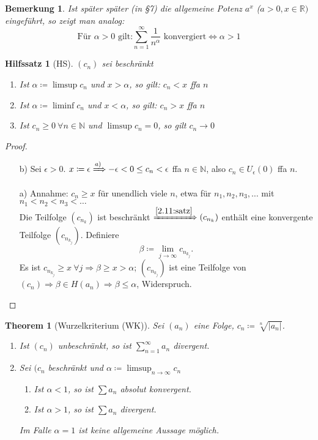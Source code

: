 \documentclass[12pt]{extreport} %
\newcommand{\N}{\mathbb{N}}
\newcommand{\R}{\mathbb{R}}
\theoremstyle{named}
\newtheorem{unnamedtheorem}{Theorem} \counterwithin{unnamedtheorem}{chapter}
\theoremstyle{dotless}
\newtheorem*{bemerkung}{Bemerkung}
\newtheorem*{hilfssatz*}{Hilfssatz}
\begin{document}
\begin{bemerkung}
	Ist später später (in \S 7) die allgemeine Potenz $a^{x}$ ($a > 0, x \in \R)$ eingeführt, so zeigt man analog:
	$$ \text{Für } \alpha > 0 \text{ gilt:} \sum_{n=1}^{\infty} \frac{1}{n^{\alpha}} \text{ konvergiert} \iff \alpha > 1 $$
\end{bemerkung}


\begin{hilfssatz*}[HS]
	$(c_{n})$ sei beschränkt
	\begin{enumerate}
		\item Ist $\alpha \coloneqq \limsup c_{n}$ und $x > \alpha$, so gilt: $c_{n} < x$ ffa $n$
				
		\item Ist $\alpha \coloneqq \liminf c_{n}$ und $x < \alpha$, so gilt: $c_{n} > x$ ffa $n$
		\item Ist $c_{n} \geq 0 ~\forall n \in \N$ und $\limsup c_{n} = 0$, so gilt $c_{n} \rightarrow 0$
	\end{enumerate}
\end{hilfssatz*}

\begin{proof} ~\
	\begin{enumerate}
		\item[b)] Sei $\epsilon > 0$. $x \coloneqq \epsilon \xRightarrow[]{a)} -\epsilon < 0 \leq c_{n} < \epsilon$ ffa $n \in \N$, also $c_{n} \in U_{\epsilon}(0)$ ffa $n$.
		\item[a)] Annahme: $c_{n} \geq x$ für unendlich viele $n$, etwa für $n_{1}, n_{2}, n_{3}, \dotsc$ mit $n_{1} < n_{2} < n_{3} < \dotsc$ \\
		 Die Teilfolge $(c_{n_{k}})$ ist beschränkt $\xRightarrow[]{\ref{2.11:satz}} (c_{n_{k}})$ enthält eine konvergente Teilfolge $(c_{n_{k_{j}}})$. Definiere
		 $$ \beta \coloneqq \lim_{j\rightarrow \infty} c_{n_{k_{j}}}. $$
		 Es ist $c_{n_{k_{j}}} \geq x ~\forall j \Rightarrow \beta \geq x > \alpha$; $(c_{n_{k_{j}}})$ ist eine Teilfolge von $(c_{n}) \Rightarrow \beta \in H(a_{n}) \Rightarrow \beta \leq \alpha$, Widerspruch.
	\end{enumerate}	
\end{proof}

\begin{unnamedtheorem}[Wurzelkriterium (WK)] \label{3.6:prop-Wurzelkriterium}
	Sei $(a_{n})$ eine Folge, $c_{n} \coloneqq \sqrt[n]{|a_{n}|}$.
	\begin{enumerate}
		\item Ist $(c_{n})$ unbeschränkt, so ist $\sum_{n=1}^{\infty} a_{n}$ divergent.
		\item Sei $(c_{n}$ beschränkt und $\alpha \coloneqq \limsup_{n \rightarrow \infty} c_{n}$
			\begin{enumerate}
				\item Ist $\alpha < 1$, so ist $\sum a_{n}$ absolut konvergent.
				\item Ist $\alpha > 1$, so ist $\sum a_{n}$ divergent.
			\end{enumerate}
			Im Falle $\alpha = 1$ ist keine allgemeine Aussage möglich.
	\end{enumerate}
\end{unnamedtheorem}
\end{document}
